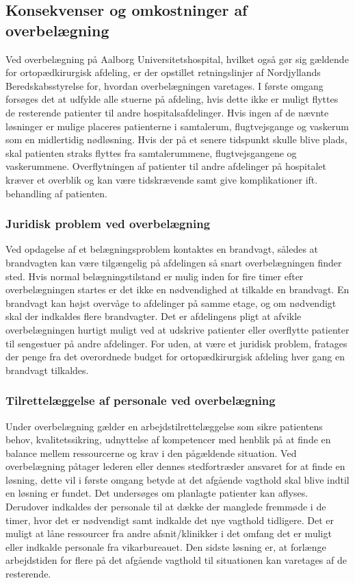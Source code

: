 \subsection{Konsekvenser og omkostninger af overbelægning}
Ved overbelægning på Aalborg Universitetshospital, hvilket også gør sig gældende for ortopædkirurgisk afdeling, er der opstillet retningslinjer af Nordjyllands Beredskabsstyrelse for, hvordan overbelægningen varetages. I første omgang forsøges det at udfylde alle stuerne på afdeling, hvis dette ikke er muligt flyttes de resterende patienter til andre hospitalsafdelinger. Hvis ingen af de nævnte løsninger er mulige placeres patienterne i samtalerum, flugtvejsgange og vaskerum som en midlertidig nødløsning. Hvis der på et senere tidspunkt skulle blive plads, skal patienten straks flyttes fra samtalerummene, flugtvejsgangene og vaskerummene. \cite{Beredskab2016} Overflytningen af patienter til andre afdelinger på hospitalet kræver et overblik og kan være tidskrævende samt give komplikationer ift. behandling af patienten. 

\subsubsection{Juridisk problem ved overbelægning}
Ved opdagelse af et belægningsproblem kontaktes en brandvagt, således at brandvagten kan være tilgængelig på afdelingen så snart overbelægningen finder sted. Hvis normal belægningstilstand er mulig inden for fire timer efter overbelægningen startes er det ikke en nødvendighed at tilkalde en brandvagt. En brandvagt kan højst overvåge to afdelinger på samme etage, og om nødvendigt skal der indkaldes flere brandvagter. Det er afdelingens pligt at  afvikle overbelægningen hurtigt muligt ved at udskrive patienter eller overflytte patienter til sengestuer på andre afdelinger. \cite{Beredskab2016} For uden, at være et juridisk problem, fratages der penge fra det overordnede budget for ortopædkirurgisk afdeling hver gang en brandvagt tilkaldes.


\subsubsection{Tilrettelæggelse af personale ved overbelægning}
Under overbelægning gælder en arbejdstilrettelæggelse som sikre patientens behov, kvalitetssikring, udnyttelse af kompetencer med henblik på at finde en balance mellem ressourcerne og krav i den pågældende situation. Ved overbelægning påtager lederen eller dennes stedfortræder ansvaret for at finde en løsning, dette vil i første omgang betyde at det afgående vagthold skal blive indtil en løsning er fundet. Det undersøges om planlagte patienter kan aflyses. Derudover indkaldes der personale til at dække der manglede fremmøde i de timer, hvor det er nødvendigt samt indkalde det nye vagthold tidligere. Det er muligt at låne ressourcer fra andre afsnit/klinikker i det omfang det er muligt eller indkalde personale fra vikarbureauet. Den sidste løsning er, at forlænge arbejdstiden for flere på det afgående vagthold til situationen kan varetages af de resterende. \cite{Bjerg2016}


